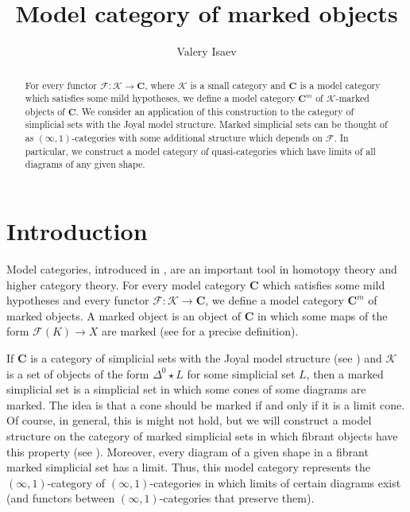 \documentclass[reqno]{amsart}
\theoremstyle{definition}
\theoremstyle{remark}
\newcommand{\cat}[1]{\mathbf{#1}}
\newcommand{\C}{\cat{C}}
\newcommand{\join}{\star}
\numberwithin{figure}{section}
\begin{document}
\title{Model category of marked objects}

\author{Valery Isaev}

\begin{abstract}
For every functor $\mathcal{F} : \mathcal{K} \to \mathbf{C}$, where $\mathcal{K}$ is a small category and $\mathbf{C}$ is a model category which satisfies some mild hypotheses,
we define a model category $\mathbf{C}^m$ of $\mathcal{K}$-marked objects of $\mathbf{C}$.
We consider an application of this construction to the category of simplicial sets with the Joyal model structure.
Marked simplicial sets can be thought of as $(\infty,1)$-categories with some additional structure which depends on $\mathcal{F}$.
In particular, we construct a model category of quasi-categories which have limits of all diagrams of any given shape.
\end{abstract}

\maketitle

\section{Introduction}

Model categories, introduced in \cite{quillen}, are an important tool in homotopy theory and higher category theory.
For every model category $\C$ which satisfies some mild hypotheses and every functor $\mathcal{F} : \mathcal{K} \to \C$, we define a model category $\C^m$ of marked objects.
A marked object is an object of $\C$ in which some maps of the form $\mathcal{F}(K) \to X$ are marked (see  for a precise definition).

If $\C$ is a category of simplicial sets with the Joyal model structure (see \cite{Joyal,lurie-topos})
and $\mathcal{K}$ is a set of objects of the form $\Delta^0 \join L$ for some simplicial set $L$,
then a marked simplicial set is a simplicial set in which some cones of some diagrams are marked.
The idea is that a cone should be marked if and only if it is a limit cone.
Of course, in general, this is might not hold, but we will construct a model structure on the category of marked simplicial sets in which fibrant objects have this property (see ).
Moreover, every diagram of a given shape in a fibrant marked simplicial set has a limit.
Thus, this model category represents the $(\infty,1)$-category of $(\infty,1)$-categories in which limits of certain diagrams exist (and functors between $(\infty,1)$-categories that preserve them).
\end{document}

